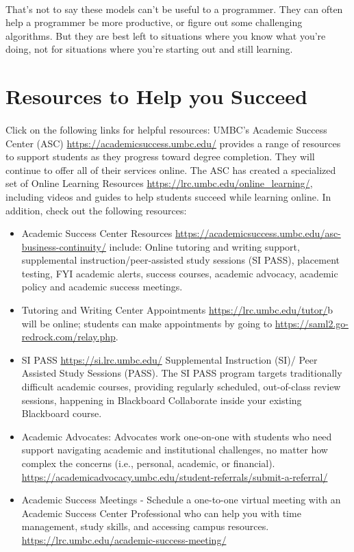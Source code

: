 \documentclass[letter,10pt]{article}
\begin{document}
\paragraph{}That's not to say these models can't be useful to a programmer. They can often help a programmer be more productive, or figure out some challenging algorithms. But they are best left to situations where you know what you're doing, not for situations where you're starting out and still learning.

\section*{Resources to Help you Succeed}
\paragraph{}Click on the following links for helpful resources:
UMBC’s Academic Success Center (ASC) \url{https://academicsuccess.umbc.edu/} provides a range of resources to support students as they progress toward degree completion. They will continue to offer all of their services online. 
The ASC has created a specialized set of Online Learning Resources \url{https://lrc.umbc.edu/online_learning/}, including videos and guides to help students succeed while learning online.
In addition, check out the following resources:

\begin{itemize}
	\item Academic Success Center Resources \url{https://academicsuccess.umbc.edu/asc-business-continuity/} include: Online tutoring and writing support, supplemental instruction/peer-assisted study sessions (SI PASS), placement testing, FYI academic alerts, success courses, academic advocacy, academic policy and academic success meetings.
	
	\item Tutoring and Writing Center Appointments \url{https://lrc.umbc.edu/tutor/}b will be online; students can make appointments by going to \url{https://saml2.go-redrock.com/relay.php}.
	
	\item SI PASS \url{https://si.lrc.umbc.edu/} Supplemental Instruction (SI)/ Peer Assisted Study Sessions (PASS). The SI PASS program targets traditionally difficult academic courses, providing regularly scheduled, out-of-class review sessions, happening in Blackboard Collaborate inside your existing Blackboard course.
	
	\item Academic Advocates: Advocates work one-on-one with students who need support navigating academic and institutional challenges, no matter how complex the concerns (i.e., personal, academic, or financial). \url{https://academicadvocacy.umbc.edu/student-referrals/submit-a-referral/}
	
	\item Academic Success Meetings - Schedule a one-to-one virtual meeting with an Academic Success Center Professional who can help you with time management, study skills, and accessing campus resources. \url{https://lrc.umbc.edu/academic-success-meeting/}
	
\end{itemize}
\end{document}
